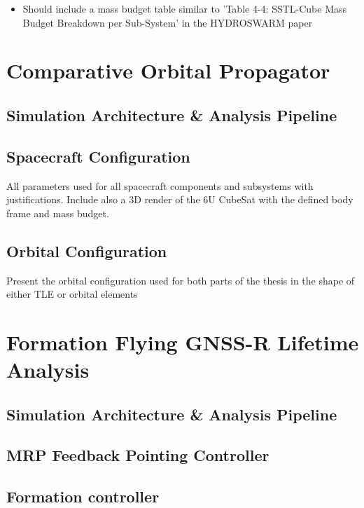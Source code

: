 \begin{itemize}
    \item Should include a mass budget table similar to 'Table 4-4: SSTL-Cube Mass Budget Breakdown per Sub-System' in the HYDROSWARM paper 
\end{itemize}


\section{Comparative Orbital Propagator}

\subsection{Simulation Architecture \& Analysis Pipeline}

\subsection{Spacecraft Configuration}
All parameters used for all spacecraft components and subsystems with justifications. Include also a 3D render of the 6U CubeSat with the defined body frame and mass budget. 

\subsection{Orbital Configuration}
Present the orbital configuration used for both parts of the thesis in the shape of either TLE or orbital elements






\section{Formation Flying GNSS-R Lifetime Analysis}

\subsection{Simulation Architecture \& Analysis Pipeline}

\subsection{MRP Feedback Pointing Controller}

\subsection{Formation controller}

